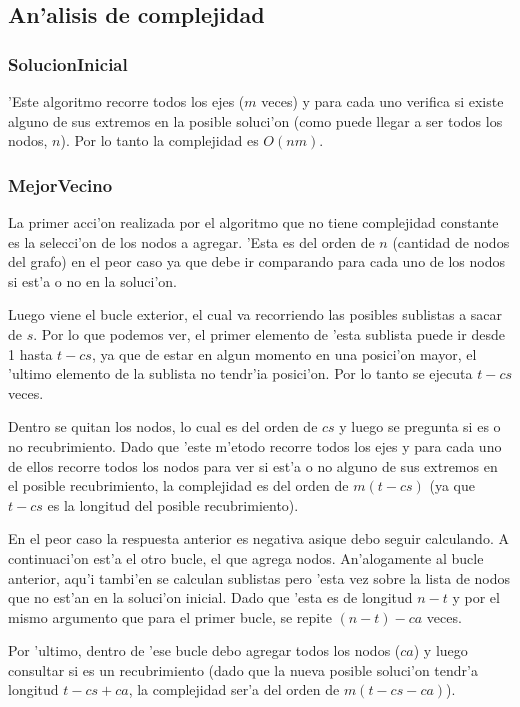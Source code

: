 \subsection{An'alisis de complejidad}
\subsubsection{SolucionInicial}
'Este algoritmo recorre todos los ejes ($m$ veces) y para cada uno verifica si existe alguno de sus extremos en la posible soluci'on (como puede llegar a ser todos los nodos, $n$). Por lo tanto la complejidad es $O(nm)$. 

\subsubsection{MejorVecino}
La primer acci'on realizada por el algoritmo que no tiene complejidad constante es la selecci'on de los nodos a agregar. 'Esta es del orden de $n$ (cantidad de nodos del grafo) en el peor caso ya que debe ir comparando para cada uno de los nodos si est'a o no en la soluci'on.

Luego viene el bucle exterior, el cual va recorriendo las posibles sublistas a sacar de $s$. Por lo que podemos ver, el primer elemento de 'esta sublista puede ir desde 1 hasta $t-cs$, ya que de estar en algun momento en una posici'on mayor, el 'ultimo elemento de la sublista no tendr'ia posici'on. Por lo tanto se ejecuta $t-cs$ veces.

Dentro se quitan los nodos, lo cual es del orden de $cs$ y luego se pregunta si es o no recubrimiento. Dado que 'este m'etodo recorre todos los ejes y para cada uno de ellos recorre todos los nodos para ver si est'a o no alguno de sus extremos en el posible recubrimiento, la complejidad es del orden de $m(t-cs)$ (ya que $t-cs$ es la longitud del posible recubrimiento).

En el peor caso la respuesta anterior es negativa asique debo seguir calculando. A continuaci'on est'a el otro bucle, el que agrega nodos. An'alogamente al bucle anterior, aqu'i tambi'en se calculan sublistas pero 'esta vez sobre la lista de nodos que no est'an en la soluci'on inicial. Dado que 'esta es de longitud $n-t$ y por el mismo argumento que para el primer bucle, se repite $(n-t)-ca$ veces.

Por 'ultimo, dentro de 'ese bucle debo agregar todos los nodos ($ca$) y luego consultar si es un recubrimiento (dado que la nueva posible soluci'on tendr'a longitud $t-cs+ca$, la complejidad ser'a del orden de $m(t-cs-ca)$).

